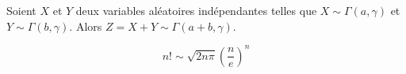 
	\begin{lemma}
		Soient $X$ et $Y$ deux variables aléatoires indépendantes telles que $X \sim \Gamma(a, \gamma)$ et $Y \sim \Gamma(b, \gamma)$. Alors $Z = X + Y \sim \Gamma(a+b, \gamma)$.
	\end{lemma}


	\begin{application}
		\[ n! \sim \sqrt{2n\pi} \left(\frac{n}{e} \right)^n \]
	\end{application}

